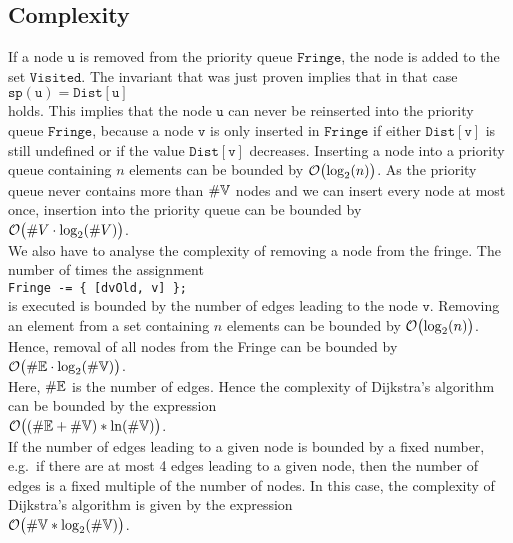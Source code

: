 \subsection{Complexity}
If a node $\mathtt{u}$ is removed from the priority queue $\mathtt{Fringe}$, the node is added to the set
$\mathtt{Visited}$.  The invariant that was just proven implies that in that case
\\[0.2cm]
\hspace*{1.3cm}
$\mathtt{sp(u)} = \mathtt{Dist[u]}$
\\[0.2cm]
holds.  This implies that the node $\mathtt{u}$ can never be reinserted into the priority queue
$\mathtt{Fringe}$, because a node $\mathtt{v}$ is only inserted in $\mathtt{Fringe}$ if either 
 $\mathtt{Dist}[\mathtt{v}]$ is still undefined or if  the  value $\mathtt{Dist}[\mathtt{v}]$ decreases.  
Inserting a node into a priority queue containing  $n$ elements can be bounded by
$\mathcal{O}\bigl(\log_2(n)\bigr)$.  As the priority queue never contains more than $\#{\mathbb V}$ nodes and we
can insert every node at most once, insertion into the priority queue can be bounded by
\\[0.2cm]
\hspace*{1.3cm}
$\mathcal{O}\bigl(\#V \cdot \log_2(\#V)\bigr)$.
\\[0.2cm]
We also have to analyse the complexity of removing a node from the fringe. 
The number of times the assignment
\\[0.2cm]
\hspace*{1.3cm}
\texttt{Fringe -= \{ [dvOld, v] \};} 
\\[0.2cm]
is executed is bounded by the number of edges leading to the node $\mathtt{v}$.
Removing an element from a set containing $n$ elements can be bounded by
 $\mathcal{O}\bigl(\log_2(n)\bigr)$.  Hence, removal of all nodes from the Fringe can be bounded by
\\[0.2cm]
\hspace*{1.3cm}
$\mathcal{O}\bigl(\#{\mathbb E} \cdot \log_2(\#{\mathbb V})\bigr)$.
\\[0.2cm]
Here,  $\#{\mathbb E}$ is the number of edges.  Hence the complexity of Dijkstra's algorithm can be
bounded by the expression \\[0.2cm]
\hspace*{1.3cm} $\mathcal{O}\bigl((\#{\mathbb E} + \#{\mathbb V}) * \ln(\#{\mathbb V})\bigr)$. \\[0.2cm]
If the number of edges leading  to a given node is bounded by a fixed number, e.g.~if there
are at most 4 edges leading to a given node, then the number of edges is a fixed multiple of the
number of nodes.  In this case, the complexity of 
 Dijkstra's algorithm is given by the expression  
\\[0.2cm]
\hspace*{1.3cm}
$\mathcal{O}\bigl(\#{\mathbb V} * \log_2(\#{\mathbb V})\bigr)$.





